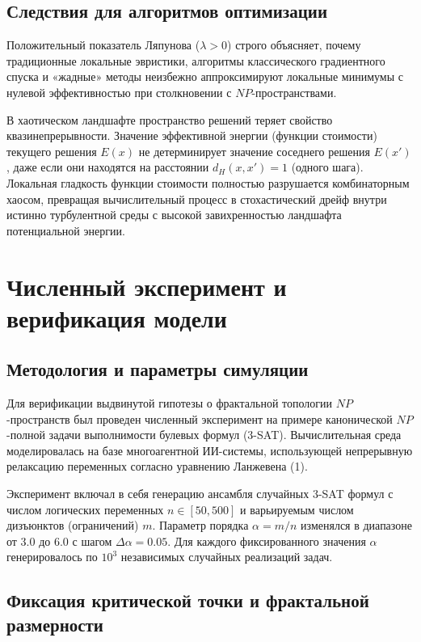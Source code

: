 \documentclass[12pt,a4paper]{article}
\begin{document}
\subsection{Следствия для алгоритмов оптимизации}

Положительный показатель Ляпунова ($\lambda > 0$) строго объясняет, почему традиционные локальные эвристики, алгоритмы классического градиентного спуска и «жадные» методы неизбежно аппроксимируют локальные минимумы с нулевой эффективностью при столкновении с $NP$-пространствами.

В хаотическом ландшафте пространство решений теряет свойство квазинепрерывности. Значение эффективной энергии (функции стоимости) текущего решения $E(x)$ не детерминирует значение соседнего решения $E(x')$, даже если они находятся на расстоянии $d_H(x, x') = 1$ (одного шага). Локальная гладкость функции стоимости полностью разрушается комбинаторным хаосом, превращая вычислительный процесс в стохастический дрейф внутри истинно турбулентной среды с высокой завихренностью ландшафта потенциальной энергии.

\section{Численный эксперимент и верификация модели}

\subsection{Методология и параметры симуляции}

Для верификации выдвинутой гипотезы о фрактальной топологии $NP$-пространств был проведен численный эксперимент на примере канонической $NP$-полной задачи выполнимости булевых формул (3-SAT). Вычислительная среда моделировалась на базе многоагентной ИИ-системы, использующей непрерывную релаксацию переменных согласно уравнению Ланжевена (1).

Эксперимент включал в себя генерацию ансамбля случайных 3-SAT формул с числом логических переменных $n \in [50, 500]$ и варьируемым числом дизъюнктов (ограничений) $m$. Параметр порядка $\alpha = m/n$ изменялся в диапазоне от $3.0$ до $6.0$ с шагом $\Delta\alpha = 0.05$. Для каждого фиксированного значения $\alpha$ генерировалось по $10^3$ независимых случайных реализаций задач.

\subsection{Фиксация критической точки и фрактальной размерности}
\end{document}

